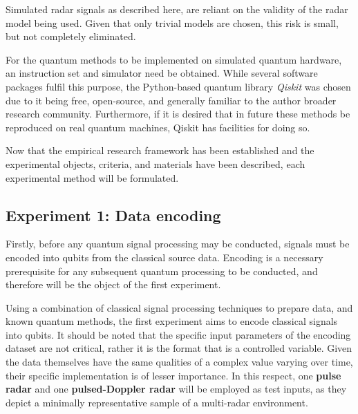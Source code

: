 Simulated radar signals as described here, are reliant on the validity of the radar model being used.
Given that only trivial models are chosen, this risk is small, but not completely eliminated.

For the quantum methods to be implemented on simulated quantum hardware, an instruction set and simulator need be obtained.
While several software packages fulfil this purpose, the Python-based quantum library \textit{Qiskit} \cite{qiskit_contributors_qiskit_2023} was chosen due to it being free, open-source, and generally familiar to the author broader research community\cite{garhwal_quantum_2021}. Furthermore, if it is desired that in future these methods be reproduced on real quantum machines, Qiskit has facilities for doing so.

Now that the empirical research framework has been established and the experimental objects, criteria, and materials have been described, each experimental method will be formulated.


\subsection{Experiment 1: Data encoding}
Firstly, before any quantum signal processing may be conducted, signals must be encoded into qubits from the classical source data.
Encoding is a necessary prerequisite for any subsequent quantum processing to be conducted, and therefore will be the object of the first experiment.

Using a combination of classical signal processing techniques to prepare data, and known quantum methods, the first experiment aims to encode classical signals into qubits.
It should be noted that the specific input parameters of the encoding dataset are not critical, rather it is the format that is a controlled variable.
Given the data themselves have the same qualities of a complex value varying over time, their specific implementation is of lesser importance.
In this respect, one \textbf{pulse radar} and one \textbf{pulsed-Doppler radar} will be employed as test inputs, as they depict a minimally representative sample of a multi-radar environment. 

